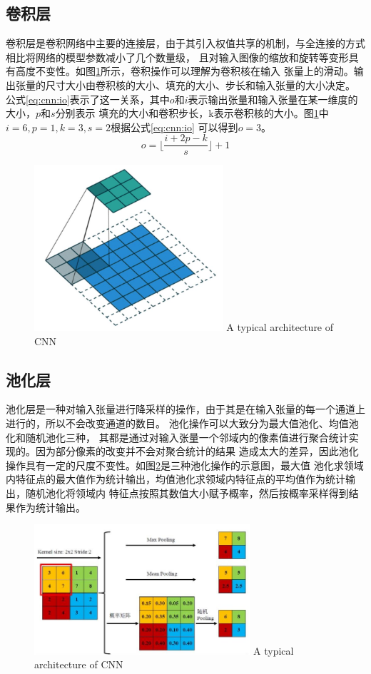 \subsection{卷积层}
	卷积层是卷积网络中主要的连接层，由于其引入权值共享的机制，与全连接的方式相比将网络的模型参数减小了几个数量级，
	且对输入图像的缩放和旋转等变形具有高度不变性。如图\ref{fig:chap4:cnn-op}所示，卷积操作可以理解为卷积核在输入
	张量上的滑动。输出张量的尺寸大小由卷积核的大小、填充的大小、步长和输入张量的大小决定。
	公式\ref{eq:cnn:io}表示了这一关系，其中$o$和$i$表示输出张量和输入张量在某一维度的大小，$p$和$s$分别表示
	填充的大小和卷积步长，k表示卷积核的大小。图\ref{fig:chap4:cnn-op}中$i=6,p=1,k=3,s=2$根据公式\ref{eq:cnn:io}
	可以得到$o=3$。
	\begin{equation}
		o = \lfloor \frac{i+2p-k}{s} \rfloor +1 \label{eq:cnn:io}
	\end{equation}
	
	\begin{figure}[h]
	  \centering
	  \includegraphics[width=7cm]{figure/chap4/CNN-op.jpg}
		{A typical architecture of CNN}
	  \label{fig:chap4:cnn-op}
	\end{figure}
\subsection{池化层}
	池化层是一种对输入张量进行降采样的操作，由于其是在输入张量的每一个通道上进行的，所以不会改变通道的数目。
	池化操作可以大致分为最大值池化、均值池化和随机池化三种，
	其都是通过对输入张量一个邻域内的像素值进行聚合统计实现的。因为部分像素的改变并不会对聚合统计的结果
	造成太大的差异，因此池化操作具有一定的尺度不变性。如图\ref{fig:pooling}是三种池化操作的示意图，最大值
	池化求领域内特征点的最大值作为统计输出，均值池化求领域内特征点的平均值作为统计输出，随机池化将领域内
	特征点按照其数值大小赋予概率，然后按概率采样得到结果作为统计输出。
	\begin{figure}[h]
	  \centering
	  \includegraphics[width=8cm]{figure/chap4/pooling.jpg}
		{A typical architecture of CNN}
	  \label{fig:pooling}
	\end{figure}
